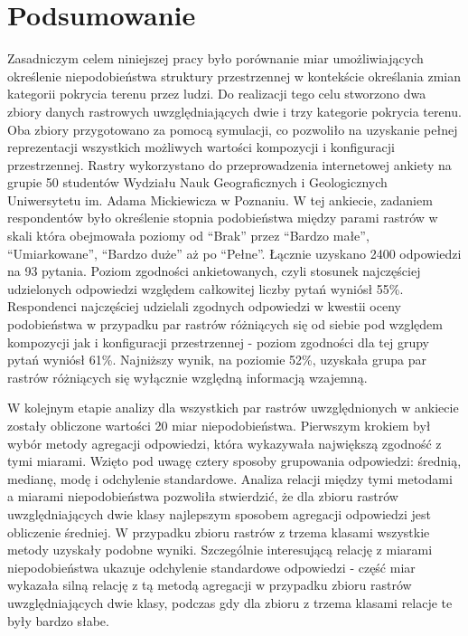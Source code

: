 \documentclass{amuthesis}
\begin{document}

\hypertarget{sec-podsumowanie}{%
\chapter{Podsumowanie}\label{sec-podsumowanie}}

Zasadniczym celem niniejszej pracy było porównanie miar umożliwiających
określenie niepodobieństwa struktury przestrzennej w kontekście
określania zmian kategorii pokrycia terenu przez ludzi. Do realizacji
tego celu stworzono dwa zbiory danych rastrowych uwzględniających dwie i
trzy kategorie pokrycia terenu. Oba zbiory przygotowano za pomocą
symulacji, co pozwoliło na uzyskanie pełnej reprezentacji wszystkich
możliwych wartości kompozycji i konfiguracji przestrzennej. Rastry
wykorzystano do przeprowadzenia internetowej ankiety na grupie 50
studentów Wydziału Nauk Geograficznych i Geologicznych Uniwersytetu im.
Adama Mickiewicza w Poznaniu. W tej ankiecie, zadaniem respondentów było
określenie stopnia podobieństwa między parami rastrów w skali która
obejmowała poziomy od ``Brak'' przez ``Bardzo małe'', ``Umiarkowane'',
``Bardzo duże'' aż po ``Pełne''. Łącznie uzyskano 2400 odpowiedzi na 93
pytania. Poziom zgodności ankietowanych, czyli stosunek najczęściej
udzielonych odpowiedzi względem całkowitej liczby pytań wyniósł 55\%.
Respondenci najczęściej udzielali zgodnych odpowiedzi w kwestii oceny
podobieństwa w przypadku par rastrów różniących się od siebie pod
względem kompozycji jak i konfiguracji przestrzennej - poziom zgodności
dla tej grupy pytań wyniósł 61\%. Najniższy wynik, na poziomie 52\%,
uzyskała grupa par rastrów różniących się wyłącznie względną informacją
wzajemną.

W kolejnym etapie analizy dla wszystkich par rastrów uwzględnionych w
ankiecie zostały obliczone wartości 20 miar niepodobieństwa. Pierwszym
krokiem był wybór metody agregacji odpowiedzi, która wykazywała
największą zgodność z tymi miarami. Wzięto pod uwagę cztery sposoby
grupowania odpowiedzi: średnią, medianę, modę i odchylenie standardowe.
Analiza relacji między tymi metodami a miarami niepodobieństwa pozwoliła
stwierdzić, że dla zbioru rastrów uwzględniających dwie klasy najlepszym
sposobem agregacji odpowiedzi jest obliczenie średniej. W przypadku
zbioru rastrów z trzema klasami wszystkie metody uzyskały podobne
wyniki. Szczególnie interesującą relację z miarami niepodobieństwa
ukazuje odchylenie standardowe odpowiedzi - część miar wykazała silną
relację z tą metodą agregacji w przypadku zbioru rastrów
uwzględniających dwie klasy, podczas gdy dla zbioru z trzema klasami
relacje te były bardzo słabe.
\end{document}
